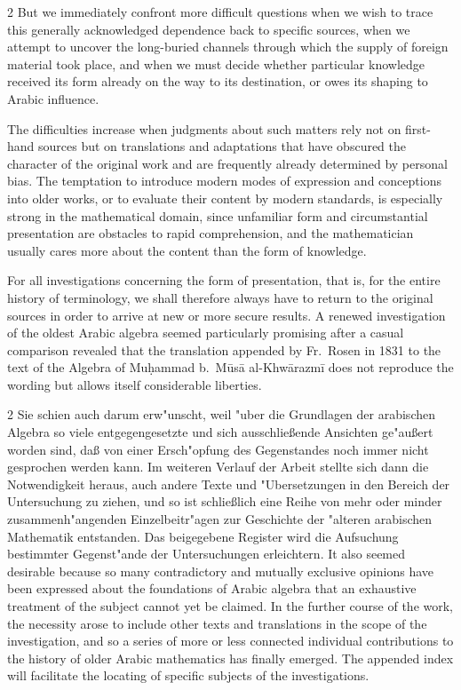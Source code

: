 \documentclass[10pt,a4paper]{article}
\renewcommand{\switchcolumn}{\syncronize\nointerlineskip\columnbreak}
\begin{document}
\begin{paracol}{2}
But we immediately confront more difficult questions when we wish to trace this generally acknowledged dependence back to specific sources, when we attempt to uncover the long-buried channels through which the supply of foreign material took place, and when we must decide whether particular knowledge received its form already on the way to its destination, or owes its shaping to Arabic influence.

The difficulties increase when judgments about such matters rely not on first-hand sources but on translations and adaptations that have obscured the character of the original work and are frequently already determined by personal bias. The temptation to introduce modern modes of expression and conceptions into older works, or to evaluate their content by modern standards, is especially strong in the mathematical domain, since unfamiliar form and circumstantial presentation are obstacles to rapid comprehension, and the mathematician usually cares more about the content than the form of knowledge.

For all investigations concerning the form of presentation, that is, for the entire history of terminology, we shall therefore always have to return to the original sources in order to arrive at new or more secure results. A renewed investigation of the oldest Arabic algebra seemed particularly promising after a casual comparison revealed that the translation appended by Fr.\ Rosen in 1831 to the text of the Algebra of Mu\d{h}ammad b.\ M\=us\=a al-Khw\=arazm\={i} does not reproduce the wording but allows itself considerable liberties.
\end{paracol}

\begin{paracol}{2}
Sie schien auch darum erw"unscht, weil "uber die Grundlagen der arabischen Algebra so viele entgegengesetzte und sich ausschlie\ss{}ende Ansichten ge"au\ss{}ert worden sind, da\ss{} von einer Ersch"opfung des Gegenstandes noch immer nicht gesprochen werden kann. Im weiteren Verlauf der Arbeit stellte sich dann die Notwendigkeit heraus, auch andere Texte und "Ubersetzungen in den Bereich der Untersuchung zu ziehen, und so ist schlie\ss{}lich eine Reihe von mehr oder minder zusammenh"angenden Einzelbeitr"agen zur Geschichte der "alteren arabischen Mathematik entstanden. Das beigegebene Register wird die Aufsuchung bestimmter Gegenst"ande der Untersuchungen erleichtern.
\switchcolumn
It also seemed desirable because so many contradictory and mutually exclusive opinions have been expressed about the foundations of Arabic algebra that an exhaustive treatment of the subject cannot yet be claimed. In the further course of the work, the necessity arose to include other texts and translations in the scope of the investigation, and so a series of more or less connected individual contributions to the history of older Arabic mathematics has finally emerged. The appended index will facilitate the locating of specific subjects of the investigations.
\end{paracol}
\end{document}
